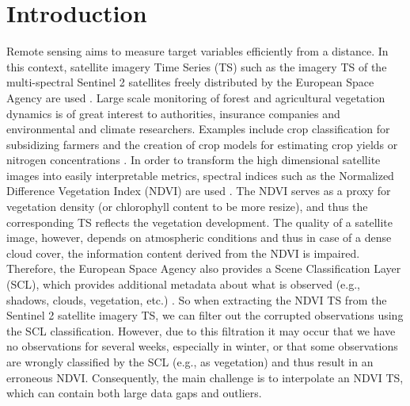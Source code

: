 \chapter{Introduction}

Remote sensing aims to measure target variables efficiently from a distance. In this context, satellite imagery Time Series ({TS}) such as the imagery {TS} of the multi-spectral Sentinel 2 satellites freely distributed by the European Space Agency are used \citep{esaSentinel22022}.
Large scale monitoring of forest and agricultural vegetation dynamics is of great interest to authorities, insurance companies and environmental and climate researchers. Examples include crop classification for subsidizing farmers \citep{henitsSentinel2EnablesNationwide2022} and the creation of crop models for estimating crop yields or nitrogen concentrations \citep{couraultSTICSCropModel2021,perichCropNitrogenRetrieval2021}. 
In order to transform the high dimensional satellite images into easily interpretable metrics, spectral indices such as the Normalized Difference Vegetation Index (NDVI) are used \citep{rouseMonitoringVernalAdvancement1974}. The NDVI serves as a proxy for vegetation density (or chlorophyll content to be more resize), and thus the corresponding {TS} reflects the vegetation development. 
The quality of a satellite image, however, depends on atmospheric conditions and thus in case of a dense cloud cover, the information content derived from the NDVI is impaired. Therefore, the European Space Agency also provides a Scene Classification Layer (SCL), which provides additional metadata about what is observed (e.g., shadows, clouds, vegetation, etc.) \citep{esaLevel2AAlgorithmOverview2022}. So when extracting the NDVI {TS} from the Sentinel 2 satellite imagery {TS}, we can filter out the corrupted observations using the SCL classification. However, due to this filtration it may occur that we have no observations for several weeks, especially in winter, or that some observations are wrongly classified by the SCL (e.g., as vegetation) and thus result in an erroneous NDVI. Consequently, the main challenge is to interpolate an NDVI {TS}, which can contain both large data gaps and outliers. 

